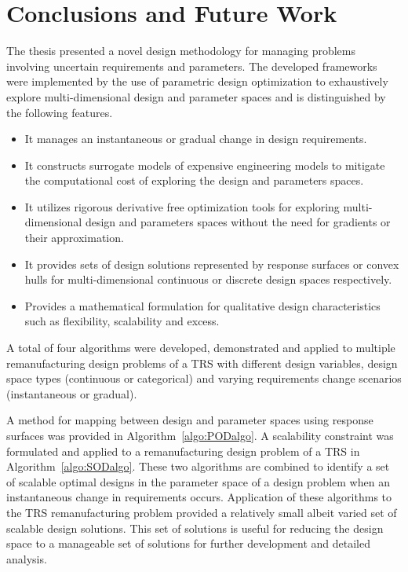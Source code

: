 \chapter{Conclusions and Future Work}
\label{ch:conclusion}

The thesis presented a novel design methodology for managing problems involving uncertain requirements and parameters. The developed frameworks were implemented by the use of parametric design optimization to exhaustively explore multi-dimensional design and parameter spaces and is distinguished by the following features.

\begin{itemize}
    \item It manages an instantaneous or gradual change in design requirements.
    \item It constructs surrogate models of expensive engineering models to mitigate the computational cost of exploring the design and parameters spaces.
    \item It utilizes rigorous derivative free optimization tools for exploring multi-dimensional design and parameters spaces without the need for gradients or their approximation.
    \item It provides sets of design solutions represented by response surfaces or convex hulls for multi-dimensional continuous or discrete design spaces respectively.
    \item Provides a mathematical formulation for qualitative design characteristics such as flexibility, scalability and excess.
\end{itemize}

A total of four algorithms were developed, demonstrated and applied to multiple remanufacturing design problems of a \ac{TRS} with different design variables, design space types (continuous or categorical) and varying requirements change scenarios (instantaneous or gradual). 

A method for mapping between design and parameter spaces using response surfaces was provided in Algorithm~\ref{algo:PODalgo}. A scalability constraint was formulated and applied to a remanufacturing design problem of a \ac{TRS} in Algorithm~\ref{algo:SODalgo}. These two algorithms are combined to identify a set of scalable optimal designs in the parameter space of a design problem when an instantaneous change in requirements occurs. Application of these algorithms to the \ac{TRS} remanufacturing problem provided a relatively small albeit varied set of scalable design solutions. This set of solutions is useful for reducing the design space to a manageable set of solutions for further development and detailed analysis.

